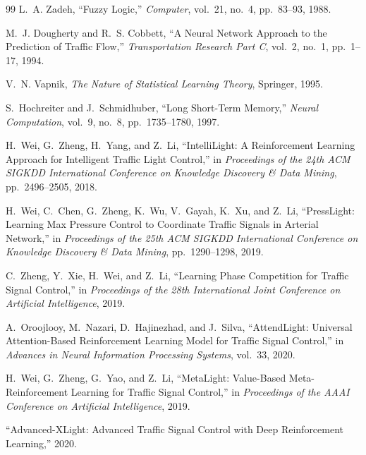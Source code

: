 \documentclass[3p,times]{elsarticle}
\theoremstyle{plain}
\theoremstyle{definition}
\begin{document}
\begin{thebibliography}{99}
L.~A. Zadeh,
``Fuzzy Logic,''
\textit{Computer},
vol.~21, no.~4, pp.~83--93, 1988.

M.~J. Dougherty and R.~S. Cobbett,
``A Neural Network Approach to the Prediction of Traffic Flow,''
\textit{Transportation Research Part C},
vol.~2, no.~1, pp.~1--17, 1994.

V.~N. Vapnik,
\textit{The Nature of Statistical Learning Theory},
Springer, 1995.

S.~Hochreiter and J.~Schmidhuber,
``Long Short-Term Memory,''
\textit{Neural Computation},
vol.~9, no.~8, pp.~1735--1780, 1997.


H.~Wei, G.~Zheng, H.~Yang, and Z.~Li,
``IntelliLight: A Reinforcement Learning Approach for Intelligent
Traffic Light Control,''
in \textit{Proceedings of the 24th ACM SIGKDD International
Conference on Knowledge Discovery \& Data Mining},
pp.~2496--2505, 2018.

H.~Wei, C.~Chen, G.~Zheng, K.~Wu, V.~Gayah, K.~Xu, and Z.~Li,
``PressLight: Learning Max Pressure Control to Coordinate Traffic
Signals in Arterial Network,''
in \textit{Proceedings of the 25th ACM SIGKDD International
Conference on Knowledge Discovery \& Data Mining},
pp.~1290--1298, 2019.

C.~Zheng, Y.~Xie, H.~Wei, and Z.~Li,
``Learning Phase Competition for Traffic Signal Control,''
in \textit{Proceedings of the 28th International Joint Conference on
Artificial Intelligence}, 2019.

A.~Oroojlooy, M.~Nazari, D.~Hajinezhad, and J.~Silva,
``AttendLight: Universal Attention-Based Reinforcement Learning
Model for Traffic Signal Control,''
in \textit{Advances in Neural Information Processing Systems},
vol.~33, 2020.

H.~Wei, G.~Zheng, G.~Yao, and Z.~Li,
``MetaLight: Value-Based Meta-Reinforcement Learning for Traffic
Signal Control,''
in \textit{Proceedings of the AAAI Conference on Artificial
Intelligence}, 2019.

``Advanced-XLight: Advanced Traffic Signal Control with Deep
Reinforcement Learning,''
2020.


\end{thebibliography}
\end{document}
